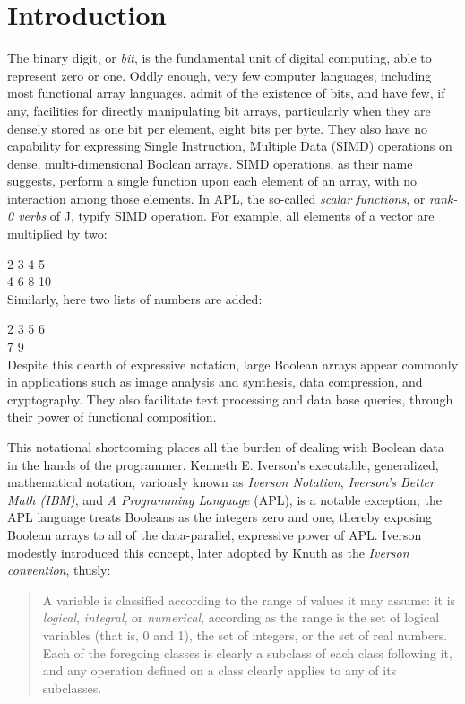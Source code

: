 \section{Introduction}
\label{introduction}

The binary digit, or {\em bit}, is the fundamental unit of 
digital computing, able to represent zero or one.
Oddly enough, very few computer languages,
including most functional array languages,
admit of the existence of bits, and have few, if any,
facilities for directly manipulating bit arrays, 
particularly when they are densely stored as one bit per 
element, eight bits per byte. They also have no capability
for expressing Single Instruction, Multiple Data (SIMD) 
operations on dense, multi-dimensional Boolean arrays.
SIMD operations, as their name suggests, perform
a single function upon each element of an array, with no
interaction among those elements.
In APL, the so-called {\em scalar functions}, or
{\em rank-0 verbs} of J, typify SIMD operation. For example,
all elements of a vector are multiplied by two:

{\qtimes{} 2 3 4 5}\\
{ 4 6 8 10}\\

\noindent Similarly, here two lists of numbers are added:

{ 2 3\qplus{} 5 6}\\
{ 7 9}\\

Despite this dearth of expressive notation,
large Boolean arrays appear commonly in applications
such as image analysis and synthesis, data compression, 
and cryptography.
They also facilitate text processing and data base queries,
through their power of functional composition.\cite{RBernecky:tokenizer}

This notational shortcoming places all the burden of dealing 
with Boolean data in the hands
of the programmer. Kenneth E. Iverson's executable,
generalized, mathematical notation, variously known as 
{\em Iverson Notation}, {\em
Iverson's Better Math (IBM)}, and {\em A Programming
Language} (APL), is a notable exception;
the APL language treats Booleans as the integers zero and one,
thereby exposing Boolean arrays 
to all of the data-parallel, expressive 
power of APL. Iverson modestly introduced this
concept, later adopted by Knuth as the {\em Iverson convention}, 
thusly:~\cite{DKnuth:twonotesonnotation}

\begin{quote}
A variable is classified according to the range of values it may 
assume: it is {\em logical}, {\em integral}, or {\em numerical},
according as the range is the set of logical variables (that is,
0 and 1), the set of integers, or the set of real numbers. Each
of the foregoing classes is clearly a subclass of each class following
it, and any operation defined on a class clearly applies to any
of its subclasses.~\cite{Iverson62}
\end{quote}

